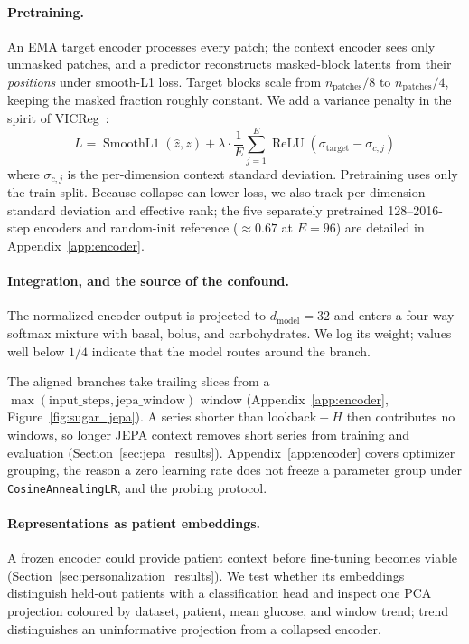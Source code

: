 \documentclass[11pt,a4paper]{article}
\begin{document}
\paragraph{Pretraining.}
An EMA target encoder processes every patch; the context encoder sees only unmasked patches, and a predictor reconstructs masked-block latents from their \emph{positions} under smooth-L1 loss.
Target blocks scale from $n_\text{patches}/8$ to $n_\text{patches}/4$, keeping the masked fraction roughly constant.
We add a variance penalty in the spirit of VICReg~\citep{bardes2022vicreg}:
\begin{equation}
    L = \operatorname{SmoothL1}(\hat{z}, z) + \lambda \cdot \frac{1}{E} \sum_{j=1}^{E} \operatorname{ReLU}\!\left(\sigma_{\text{target}} - \sigma_{c,j}\right)
\end{equation}
where $\sigma_{c,j}$ is the per-dimension context standard deviation.
Pretraining uses only the train split.
Because collapse can lower loss, we also track per-dimension standard deviation and effective rank; the five separately pretrained 128--2016-step encoders and random-init reference ($\approx0.67$ at $E=96$) are detailed in Appendix~\ref{app:encoder}.

\paragraph{Integration, and the source of the confound.}
The normalized encoder output is projected to $d_\text{model}=32$ and enters a four-way softmax mixture with basal, bolus, and carbohydrates.
We log its weight; values well below $1/4$ indicate that the model routes around the branch.

The aligned branches take trailing slices from a $\max(\text{input\_steps},\text{jepa\_window})$ window (Appendix~\ref{app:encoder}, Figure~\ref{fig:sugar_jepa}).
A series shorter than $\text{lookback}+H$ then contributes no windows, so longer JEPA context removes short series from training and evaluation (Section~\ref{sec:jepa_results}).
Appendix~\ref{app:encoder} covers optimizer grouping, the reason a zero learning rate does not freeze a parameter group under \texttt{CosineAnnealingLR}, and the probing protocol.

\paragraph{Representations as patient embeddings.}
A frozen encoder could provide patient context before fine-tuning becomes viable (Section~\ref{sec:personalization_results}).
We test whether its embeddings distinguish held-out patients with a classification head and inspect one PCA projection coloured by dataset, patient, mean glucose, and window trend; trend distinguishes an uninformative projection from a collapsed encoder.
\end{document}
